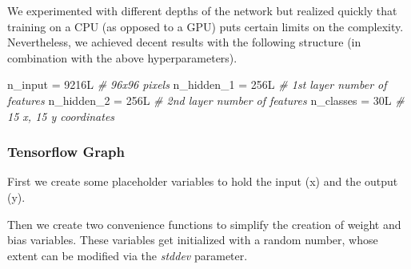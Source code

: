 \documentclass[]{article}
\newenvironment{Shaded}{\begin{snugshade}}{\end{snugshade}}
\newcommand{\KeywordTok}[1]{\textcolor[rgb]{0.13,0.29,0.53}{\textbf{{#1}}}}
\newcommand{\DataTypeTok}[1]{\textcolor[rgb]{0.13,0.29,0.53}{{#1}}}
\newcommand{\FloatTok}[1]{\textcolor[rgb]{0.00,0.00,0.81}{{#1}}}
\newcommand{\StringTok}[1]{\textcolor[rgb]{0.31,0.60,0.02}{{#1}}}
\newcommand{\CommentTok}[1]{\textcolor[rgb]{0.56,0.35,0.01}{\textit{{#1}}}}
\newcommand{\OtherTok}[1]{\textcolor[rgb]{0.56,0.35,0.01}{{#1}}}
\newcommand{\NormalTok}[1]{{#1}}
\begin{document}
We experimented with different depths of the network but realized
quickly that training on a CPU (as opposed to a GPU) puts certain limits
on the complexity. Nevertheless, we achieved decent results with the
following structure (in combination with the above hyperparameters).

\begin{Shaded}
\begin{Highlighting}[]
\NormalTok{n_input =}\StringTok{ }\NormalTok{9216L }\CommentTok{# 96x96 pixels}
\NormalTok{n_hidden_1 =}\StringTok{ }\NormalTok{256L }\CommentTok{# 1st layer number of features}
\NormalTok{n_hidden_2 =}\StringTok{ }\NormalTok{256L }\CommentTok{# 2nd layer number of features}
\NormalTok{n_classes =}\StringTok{ }\NormalTok{30L }\CommentTok{# 15 x, 15 y coordinates}
\end{Highlighting}
\end{Shaded}

\subsubsection{Tensorflow Graph}\label{tensorflow-graph}

First we create some placeholder variables to hold the input (x) and the
output (y).

\begin{Shaded}
\end{Shaded}

Then we create two convenience functions to simplify the creation of
weight and bias variables. These variables get initialized with a random
number, whose extent can be modified via the \emph{stddev} parameter.

\begin{Shaded}
\end{Shaded}
\end{document}
